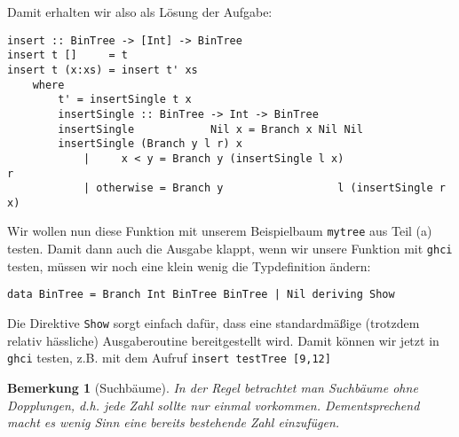 \documentclass[ngerman, a4paper, 11pt]{article}
\newcounter{themcount}
\theoremstyle{nonumberplain}
\newtheorem{bemerkung}[themcount]{Bemerkung}
\begin{document}
Damit erhalten wir also als Lösung der Aufgabe:
\begin{lstlisting}[style=frame]
insert :: BinTree -> [Int] -> BinTree
insert t []     = t
insert t (x:xs) = insert t' xs
	where
		t' = insertSingle t x
		insertSingle :: BinTree -> Int -> BinTree
		insertSingle            Nil x = Branch x Nil Nil
		insertSingle (Branch y l r) x
			|     x < y = Branch y (insertSingle l x)                  r
			| otherwise = Branch y                  l (insertSingle r x)
\end{lstlisting}

Wir wollen nun diese Funktion mit unserem Beispielbaum \texttt{mytree} aus Teil (a) testen.
Damit dann auch die Ausgabe klappt, wenn wir unsere Funktion mit \texttt{ghci} testen, müssen wir noch eine klein wenig die Typdefinition ändern:
\begin{lstlisting}[style=noframe]
	data BinTree = Branch Int BinTree BinTree | Nil deriving Show
\end{lstlisting}
Die Direktive \texttt{Show} sorgt einfach dafür, dass eine standardmäßige (trotzdem relativ hässliche) Ausgaberoutine bereitgestellt wird.
Damit können wir jetzt in \texttt{ghci} testen, z.B. mit dem Aufruf \texttt{insert testTree [9,12]}

\begin{bemerkung}[Suchbäume]
	In der Regel betrachtet man Suchbäume ohne Dopplungen, d.h. jede Zahl sollte nur einmal vorkommen. Dementsprechend macht es wenig Sinn eine bereits bestehende Zahl einzufügen. 
\end{bemerkung}
\end{document}
